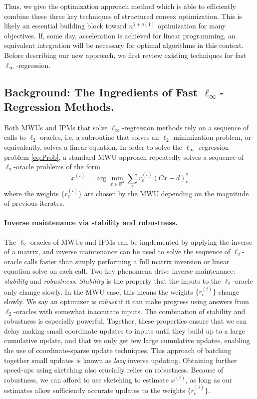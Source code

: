 \documentclass[11pt]{article}
\newcommand\dd{\boldsymbol{\mathit{d}}}
\newcommand\xx{\boldsymbol{\mathit{x}}}
\newcommand\CC{\boldsymbol{\mathit{C}}}
\begin{document}
Thus, we give the optimization approach method which is able to efficiently combine these three key techniques of structured convex optimization. 
This is likely an essential building block toward $n^{2+o(1)}$ optimization for many objectives.
If, some day, acceleration is achieved for linear programming, an equivalent integration will be necessary for optimal algorithms in this context.
Before describing our new approach, we first review existing techniques for fast $\ell_\infty$-regression.

\subsection{Background: The Ingredients of Fast \texorpdfstring{$\ell_\infty$}{}-Regression Methods.}
Both MWUs and IPMs that solve $\ell_\infty$-regression methods rely on a sequence of calls to $\ell_2$-oracles, i.e. a subroutine that solves an $\ell_2$-minimization problem, or equivalently, solves a linear equation.
In order to solve the $\ell_\infty$-regression problem \eqref{eq:Prob}, a standard MWU approach repeatedly solves a sequence of $\ell_2$-oracle problems of the form
\begin{equation}\label{eq:L2Oracle}
    \xx^{(i)} = \arg\min_{\xx\in \mathbb{R}^d} 
    \sum_e r_e^{(i)} (\CC\xx-\dd)_e^2
\end{equation}
where the weights $\{r_e^{(i)}\}$ are chosen by the MWU depending on the magnitude of previous iterates.

\paragraph{Inverse maintenance via stability and robustness.}
The $\ell_2$-oracles of MWUs and IPMs can be implemented by applying the inverse of a matrix, and inverse maintenance can be used to solve the sequence of $\ell_2$-oracle calls faster than simply performing a full matrix inversion or linear equation solve on each call.
Two key phenomena drive inverse maintenance: \emph{stability} and \emph{robustness}.
\emph{Stability} is the property that the inputs to the $\ell_2$-oracle only change slowly. In the MWU case, this means the weights $\{r_e^{(i)}\}$ change slowly.
We say an optimizer is \emph{robust} if it can make progress using answers from $\ell_2$-oracles with somewhat inaccurate inputs.
The combination of stability and robustness is especially powerful.
Together, these properties ensure that we can delay making small coordinate updates to inputs until they build up to a large cumulative update, and that we only get few large cumulative updates, enabling the use of coordinate-sparse update techniques.
This approach of batching together small updates is known as \emph{lazy} inverse updating.
Obtaining further speed-ups using sketching also crucially relies on robustness. 
Because of robustness, we can afford to use sketching to estimate $\xx^{(i)}$, as long as our estimates allow sufficiently accurate updates to the weights $\{r_e^{(i)}\}$.
\end{document}
